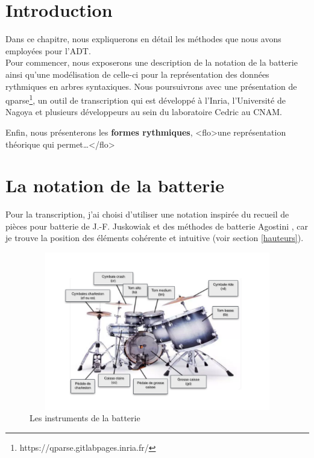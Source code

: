 \section*{Introduction}
Dans ce chapitre, nous expliquerons en détail les méthodes que nous avons
employées pour l’ADT.\\
Pour commencer, nous exposerons une description de la notation de la batterie
ainsi qu’une modélisation de celle-ci pour la représentation des données
rythmiques en arbres syntaxiques. Nous poursuivrons avec une présentation de
qparse\footnote{https://qparse.gitlabpages.inria.fr/}, un outil de
transcription qui est développé à l'Inria, l'Université de Nagoya et plusieurs
développeurs au sein du laboratoire Cedric au CNAM.

Enfin, nous présenterons les \textbf{formes rythmiques}, <flo>une
représentation
théorique qui permet…</flo> 

\section{La notation de la batterie}
\label{notation_batterie}
Pour la transcription, j’ai choisi d’utiliser une notation inspirée du recueil
de pièces pour batterie de J.-F. Juskowiak \cite{jusko} et des méthodes de
batterie Agostini \cite{ago_meth_3}, car je trouve la position des éléments
cohérente et intuitive (voir section \ref{hauteurs}).\newpage

\begin{figure}[h]
\centering
\includegraphics[height=69mm, width=115mm]{
z_images/3_methodes/0_notation_de_la_batterie/batterie.png}
\caption{Les instruments de la batterie}
\label{instru_batt}
\end{figure}


